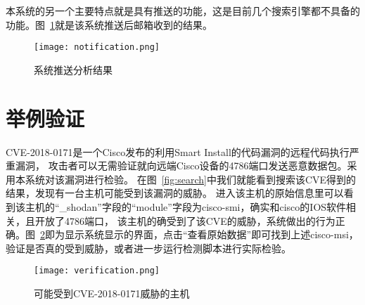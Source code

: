 本系统的另一个主要特点就是具有推送的功能，这是目前几个搜索引擎都不具备的功能。图~\ref{fig:notification}就是该系统推送后邮箱收到的结果。

\begin{figure}[H]
    \centering
    \texttt{[image: notification.png]}
    \caption{系统推送分析结果}
    \label{fig:notification}
\end{figure}

\section{举例验证}
\label{sec:verification}

CVE-2018-0171是一个Cisco发布的利用Smart Install的代码漏洞的远程代码执行严重漏洞，
攻击者可以无需验证就向远端Cisco设备的4786端口发送恶意数据包。采用本系统对该漏洞进行检验。
在图~\ref{fig:search}中我们就能看到搜索该CVE得到的结果，发现有一台主机可能受到该漏洞的威胁。
进入该主机的原始信息里可以看到该主机的“\_shodan”字段的“module”字段为cisco-smi，确实和cisco的IOS软件相关，且开放了4786端口，
该主机的确受到了该CVE的威胁，系统做出的行为正确。图~\ref{fig:verification}即为显示系统显示的界面，点击“查看原始数据”即可找到上述cisco-msi，
验证是否真的受到威胁，或者进一步运行检测脚本进行实际检验。

\begin{figure}[H]
    \centering
    \texttt{[image: verification.png]}
    \caption{可能受到CVE-2018-0171威胁的主机}
    \label{fig:verification}
\end{figure}
